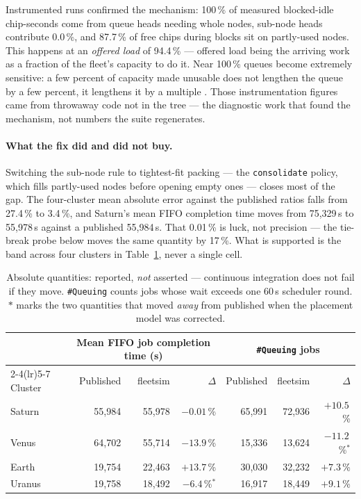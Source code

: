 Instrumented runs confirmed the mechanism: 100\,\% of measured blocked-idle
chip-seconds come from queue heads needing whole nodes, sub-node heads
contribute 0.0\,\%, and 87.7\,\% of free chips during blocks sit on partly-used
nodes. This happens at an \emph{offered load} of 94.4\,\% --- offered load being
the arriving work as a fraction of the fleet's capacity to do it. Near 100\,\%
queues become extremely sensitive: a few percent of capacity made unusable does
not lengthen the queue by a few percent, it lengthens it by a multiple
\cite{kingman1961}. Those instrumentation figures came from throwaway code not
in the tree --- the diagnostic work that found the mechanism, not numbers the
suite regenerates.

\paragraph{What the fix did and did not buy.}
Switching the sub-node rule to tightest-fit packing --- the \texttt{consolidate}
policy, which fills partly-used nodes before opening empty ones --- closes most
of the gap. The four-cluster mean absolute error against the published ratios
falls from 27.4\,\% to 3.4\,\%, and Saturn's mean FIFO completion time moves
from 75{,}329\,s to 55{,}978\,s against a published 55{,}984\,s. That 0.01\,\%
is luck, not precision --- the tie-break probe below moves the same quantity by
17\,\%. What is supported is the band across four clusters in
Table~\ref{tab:helios-abs}, never a single cell.

\begin{table}[t]
\centering\small
\caption{Absolute quantities: reported, \emph{not} asserted --- continuous
integration does not fail if they move. \texttt{\#Queuing} counts jobs whose wait
exceeds one 60\,s scheduler round. $\ast$ marks the two quantities that moved
\emph{away} from published when the placement model was corrected.}
\label{tab:helios-abs}
\begin{tabular}{lrrrrrr}
\toprule
& \multicolumn{3}{c}{Mean FIFO job completion time (s)} & \multicolumn{3}{c}{\texttt{\#Queuing} jobs} \\
\cmidrule(lr){2-4}\cmidrule(lr){5-7}
Cluster & Published & fleetsim & $\Delta$ & Published & fleetsim & $\Delta$ \\
\midrule
Saturn & 55{,}984 & 55{,}978 & $-0.01$\,\%       & 65{,}991 & 72{,}936 & $+10.5$\,\% \\
Venus  & 64{,}702 & 55{,}714 & $-13.9$\,\%       & 15{,}336 & 13{,}624 & $-11.2$\,\%$^\ast$ \\
Earth  & 19{,}754 & 22{,}463 & $+13.7$\,\%       & 30{,}030 & 32{,}232 & $+7.3$\,\% \\
Uranus & 19{,}758 & 18{,}492 & $-6.4$\,\%$^\ast$ & 16{,}917 & 18{,}449 & $+9.1$\,\% \\
\bottomrule
\end{tabular}
\end{table}

